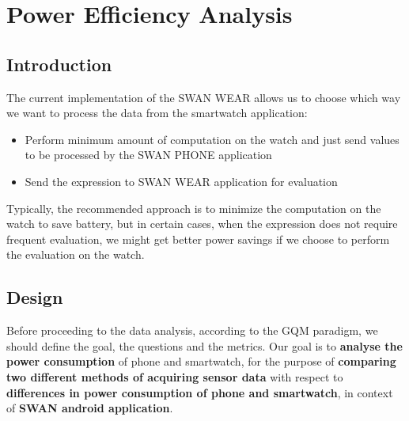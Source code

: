 
\chapter{Power Efficiency Analysis} %

\label{Chapter6} %



\section{Introduction}
The current implementation of the SWAN WEAR allows us to choose which way we want to process the data from the smartwatch application:
\begin{itemize}
 \item Perform minimum amount of computation on the watch and just send values to be processed by the SWAN PHONE application
 \item Send the expression to SWAN WEAR application for evaluation
\end{itemize}

Typically, the recommended approach is to minimize the computation on the watch to save battery, but in certain cases,  when the expression does not require frequent evaluation, we might get better power savings if we choose to perform the evaluation on the watch.

\section{Design}
Before proceeding to the data analysis, according to the GQM\cite{gqm_1}\cite{gqm_2} paradigm, we should define the goal, the questions and the metrics.
    Our goal is to \textbf{analyse the power consumption} of phone and smartwatch, for the purpose of \textbf{comparing two different methods of acquiring sensor data}
    with respect to \textbf{differences in power consumption of phone and smartwatch}, in context of \textbf{SWAN android application}.

